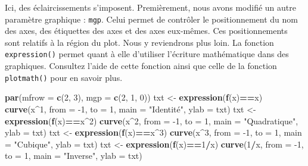 \documentclass[]{article}
\newenvironment{Shaded}{\begin{snugshade}}{\end{snugshade}}
\newcommand{\DataTypeTok}[1]{\textcolor[rgb]{0.13,0.29,0.53}{#1}}
\newcommand{\DecValTok}[1]{\textcolor[rgb]{0.00,0.00,0.81}{#1}}
\newcommand{\KeywordTok}[1]{\textcolor[rgb]{0.13,0.29,0.53}{\textbf{#1}}}
\newcommand{\NormalTok}[1]{#1}
\newcommand{\OperatorTok}[1]{\textcolor[rgb]{0.81,0.36,0.00}{\textbf{#1}}}
\newcommand{\StringTok}[1]{\textcolor[rgb]{0.31,0.60,0.02}{#1}}
\begin{document}
Ici, des éclaircissements s'imposent. Premièrement, nous avons modifié un autre paramètre graphique : \texttt{mgp}. Celui permet de contrôler le positionnement du nom des axes, des étiquettes des axes et des axes eux-mêmes. Ces positionnements sont relatifs à la région du plot. Nous y reviendrons plus loin.
La fonction \texttt{expression()} permet quant à elle d'utiliser l'écriture mathématique dans des graphiques. Consultez l'aide de cette fonction ainsi que celle de la fonction \texttt{plotmath()} pour en savoir plus.

\begin{Shaded}
\begin{Highlighting}[]
\KeywordTok{par}\NormalTok{(}\DataTypeTok{mfrow =} \KeywordTok{c}\NormalTok{(}\DecValTok{2}\NormalTok{, }\DecValTok{3}\NormalTok{), }\DataTypeTok{mgp =} \KeywordTok{c}\NormalTok{(}\DecValTok{2}\NormalTok{, }\DecValTok{1}\NormalTok{, }\DecValTok{0}\NormalTok{))}
\NormalTok{txt <-}\StringTok{ }\KeywordTok{expression}\NormalTok{(}\KeywordTok{f}\NormalTok{(x)}\OperatorTok{==}\NormalTok{x)}
\KeywordTok{curve}\NormalTok{(x}\OperatorTok{^}\DecValTok{1}\NormalTok{, }\DataTypeTok{from =} \DecValTok{-1}\NormalTok{, }\DataTypeTok{to =} \DecValTok{1}\NormalTok{, }\DataTypeTok{main =} \StringTok{"Identité"}\NormalTok{, }\DataTypeTok{ylab =}\NormalTok{ txt)}
\NormalTok{txt <-}\StringTok{ }\KeywordTok{expression}\NormalTok{(}\KeywordTok{f}\NormalTok{(x)}\OperatorTok{==}\NormalTok{x}\OperatorTok{^}\DecValTok{2}\NormalTok{)}
\KeywordTok{curve}\NormalTok{(x}\OperatorTok{^}\DecValTok{2}\NormalTok{, }\DataTypeTok{from =} \DecValTok{-1}\NormalTok{, }\DataTypeTok{to =} \DecValTok{1}\NormalTok{, }\DataTypeTok{main =} \StringTok{"Quadratique"}\NormalTok{, }\DataTypeTok{ylab =}\NormalTok{ txt)}
\NormalTok{txt <-}\StringTok{ }\KeywordTok{expression}\NormalTok{(}\KeywordTok{f}\NormalTok{(x)}\OperatorTok{==}\NormalTok{x}\OperatorTok{^}\DecValTok{3}\NormalTok{)}
\KeywordTok{curve}\NormalTok{(x}\OperatorTok{^}\DecValTok{3}\NormalTok{, }\DataTypeTok{from =} \DecValTok{-1}\NormalTok{, }\DataTypeTok{to =} \DecValTok{1}\NormalTok{, }\DataTypeTok{main =} \StringTok{"Cubique"}\NormalTok{, }\DataTypeTok{ylab =}\NormalTok{ txt)}
\NormalTok{txt <-}\StringTok{ }\KeywordTok{expression}\NormalTok{(}\KeywordTok{f}\NormalTok{(x)}\OperatorTok{==}\DecValTok{1}\OperatorTok{/}\NormalTok{x)}
\KeywordTok{curve}\NormalTok{(}\DecValTok{1}\OperatorTok{/}\NormalTok{x, }\DataTypeTok{from =} \DecValTok{-1}\NormalTok{, }\DataTypeTok{to =} \DecValTok{1}\NormalTok{, }\DataTypeTok{main =} \StringTok{"Inverse"}\NormalTok{, }\DataTypeTok{ylab =}\NormalTok{ txt)}

\end{Highlighting}
\end{Shaded}
\end{document}
